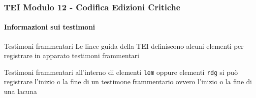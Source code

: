
















\begin{frame}
    \frametitle{TEI Modulo 12 - Codifica Edizioni Critiche}
    \framesubtitle{Informazioni sui testimoni}
    \addtocounter{nframe}{1}
    
    \begin{block}{Testimoni frammentari}
       Le linee guida della TEI definiscono alcuni elementi per registrare in apparato testimoni frammentari
    \end{block}

    \begin{block}{Testimoni frammentari}
        all'interno di elementi \texttt{lem} oppure elementi \texttt{rdg} si può registrare l'inizio o la fine di un testimone frammentario ovvero l'inizio o la fine di una lacuna
     \end{block}


\end{frame}


